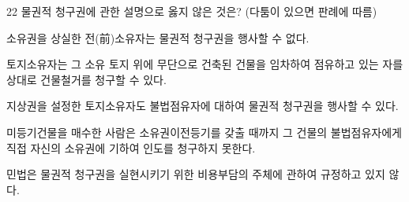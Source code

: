 \begin{question}{22}
물권적 청구권에 관한 설명으로 옳지 않은 것은? (다툼이 있으면 판례에 따름)
\begin{choices}
  \item 소유권을 상실한 전(前)소유자는 물권적 청구권을 행사할 수 없다.
  \item 토지소유자는 그 소유 토지 위에 무단으로 건축된 건물을 임차하여 점유하고 있는 자를 상대로 건물철거를 청구할 수 있다.
  \item 지상권을 설정한 토지소유자도 불법점유자에 대하여 물권적 청구권을 행사할 수 있다.
  \item 미등기건물을 매수한 사람은 소유권이전등기를 갖출 때까지 그 건물의 불법점유자에게 직접 자신의 소유권에 기하여 인도를 청구하지 못한다.
  \item 민법은 물권적 청구권을 실현시키기 위한 비용부담의 주체에 관하여 규정하고 있지 않다.
\end{choices}
\end{question}
